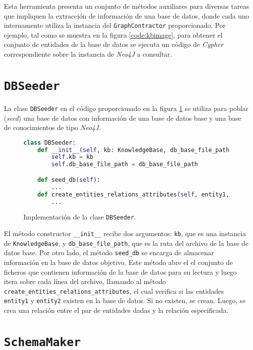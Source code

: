 Esta herramienta presenta un conjunto de métodos auxiliares para diversas tareas que impliquen la extracción de información de una base de datos, donde cada uno internamente utiliza la instancia del \texttt{GraphContractor} proporcionado. Por ejemplo, tal como se muestra en la figura \ref{code:kbimage}, para obtener el conjunto de entidades de la base de datos se ejecuta un código de \textit{Cypher} correspondiente sobre la instancia de \textit{Neo4J} a consultar.

\section{\texttt{DBSeeder}}

La clase \texttt{DBSeeder} en el código proporcionado en la figura \ref{code:dbseeder} se utiliza para poblar (\textit{seed}) una base de datos con información de una base de datos base y una base de conocimientos de tipo \textit{Neo4J}.

\begin{figure}[H]
\begin{lstlisting}[language=python]
class DBSeeder:
	def __init__(self, kb: KnowledgeBase, db_base_file_path: str) -> None:
        self.kb = kb
        self.db_base_file_path = db_base_file_path

    def seed_db(self):
		...
	def create_entities_relations_attributes(self, entity1, relation_type, entity2):
		...
\end{lstlisting}
\caption{Implementación de la clase \texttt{DBSeeder}.}
\label{code:dbseeder}
\end{figure}

El método constructor \texttt{\_\_init\_\_} recibe dos argumentos: \texttt{kb}, que es una instancia de \texttt{KnowledgeBase}, y \texttt{db\_base\_file\_path}, que es la ruta del archivo de la base de datos base. Por otro lado, el método \texttt{seed\_db} se encarga de almacenar información en la base de datos objetivo. Este método abre el el conjunto de ficheros que contienen información de la base de datos para su lectura y luego itera sobre cada línea del archivo, llamando al método \texttt{create\_entities\_relations\_attributes}, el cual verifica si las entidades \texttt{entity1} y \texttt{entity2} existen en la base de datos. Si no existen, se crean. Luego, se crea una relación entre el par de entidades dadas y la relación especificada.


\section{\texttt{SchemaMaker}}

